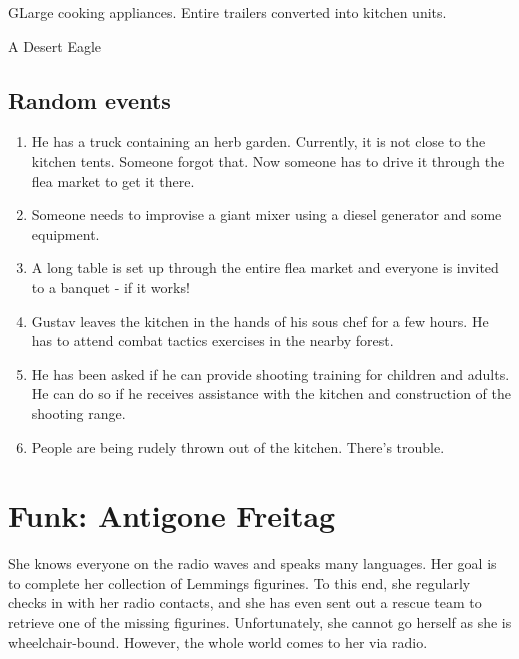 \begin{npcBox}[title=Gustav Müller]
    \begin{consequences}
    \item {}
    \item {}
    \item {}
    \end{consequences}

    \begin{equipment}
    \item GLarge cooking appliances. Entire trailers converted into kitchen units.
    \item A Desert Eagle
    \end{equipment}
\end{npcBox}


\subsection{Random events}

\begin{enumerate}
\item He has a truck containing an herb garden. Currently, it is not close to the kitchen tents. Someone forgot that. Now someone has to drive it through the flea market to get it there.
\item Someone needs to improvise a giant mixer using a diesel generator and some equipment.
\item A long table is set up through the entire flea market and everyone is invited to a banquet - if it works!
\item Gustav leaves the kitchen in the hands of his sous chef for a few hours. He has to attend combat tactics exercises in the nearby forest.
\item He has been asked if he can provide shooting training for children and adults. He can do so if he receives assistance with the kitchen and construction of the shooting range.
\item People are being rudely thrown out of the kitchen. There's trouble.
\end{enumerate}

\newpage

\section{Funk: Antigone Freitag}

She knows everyone on the radio waves and speaks many languages. Her goal is to complete her collection of Lemmings figurines. To this end, she regularly checks in with her radio contacts, and she has even sent out a rescue team to retrieve one of the missing figurines. Unfortunately, she cannot go herself as she is wheelchair-bound. However, the whole world comes to her via radio.

